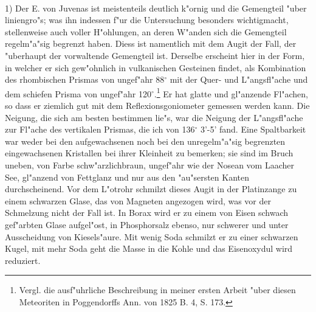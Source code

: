 \documentclass[a4paper, 11pt, oneside]{article}
\begin{document}
\paragraph{}
1) Der E. von Juvenas ist meistenteils deutlich k"ornig und die Gemengteil "uber liniengro"s; was ihn indessen f"ur die Untersuchung besonders wichtigmacht, stellenweise auch voller H"ohlungen‚ an deren W"anden sich die Gemengteil regelm"a"sig begrenzt haben. Diess ist namentlich mit dem Augit der Fall, der "uberhaupt der vorwaltende Gemengteil ist. Derselbe erscheint hier in der Form, in welcher er sich gew"ohnlich in vulkanischen Gesteinen findet, als Kombination des rhombischen Prismas von ungef"ahr 88$^{\circ}$ mit der Quer- und L"angsfl"ache und dem schiefen Prisma von ungef"ahr 120$^{\circ}$.\footnote{Vergl. die ausf"uhrliche Beschreibung in meiner ersten Arbeit "uber diesen Meteoriten in Poggendorffs Ann. von 1825 B. 4, S. 173.} Er hat glatte und gl"anzende Fl"achen, so dass er ziemlich gut mit dem Reflexionsgoniometer gemessen werden kann. Die Neigung, die sich am besten bestimmen lie"s, war die Neigung der L"angsfl"ache zur Fl"ache des vertikalen Prismas, die ich von 136$^{\circ}$ 3’-5’ fand. Eine Spaltbarkeit war weder bei den aufgewachsenen noch bei den unregelm"a"sig begrenzten eingewachsenen Kristallen bei ihrer Kleinheit zu bemerken; sie sind im Bruch uneben, von Farbe schw"arzlichbraun, ungef"ahr wie der Nosean vom Laacher See, gl"anzend von Fettglanz und nur aus den "au"sersten Kanten durchscheinend. Vor dem L"otrohr schmilzt dieses Augit in der Platinzange zu einem schwarzen Glase, das von Magneten angezogen wird, was vor der Schmelzung nicht der Fall ist. In Borax wird er zu einem von Eisen schwach gef"arbten Glase aufgel"ost, in Phosphorsalz ebenso, nur schwerer und unter Ausscheidung von Kiesels"aure. Mit wenig Soda schmilzt er zu einer schwarzen Kugel, mit mehr Soda geht die Masse in die Kohle und das Eisenoxydul wird reduziert.
\end{document}
